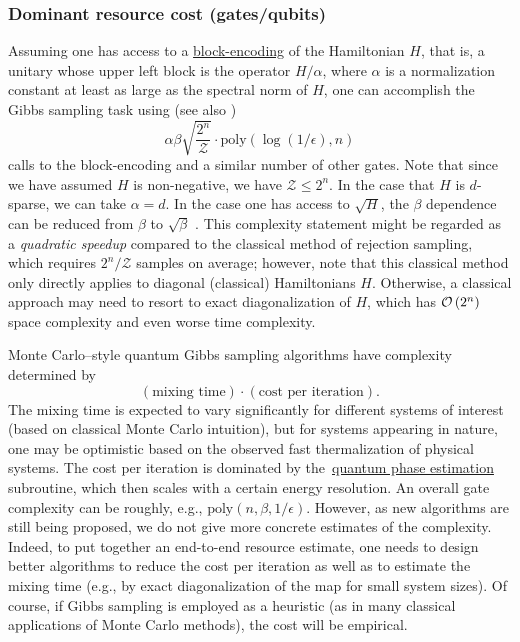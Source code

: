 \begin{refsection}

\subsubsection*{Dominant resource cost (gates/qubits)}

Assuming one has access to a \hyperref[prim:BlockEncodings]{block-encoding} of the Hamiltonian $H$, that is, a unitary whose upper left block is the operator $H/\alpha$, where $\alpha$ is a normalization constant at least as large as the spectral norm of $H$, one can accomplish the Gibbs sampling task using \cite[Lemma 44]{apeldoorn2017QSDPSolvers} (see also \cite[Corollary 16]{apeldoorn2018ImprovedQSDPSolving})
\begin{equation}\label{eq:Gibbs_complexity}
    \alpha\beta \sqrt{\frac{2^n}{\mathcal{Z}}} \cdot \text{poly}(\log(1/\epsilon), n)
\end{equation}
calls to the block-encoding and a similar number of other gates. 
Note that since we have assumed $H$ is non-negative, we have $\mathcal{Z}\leq 2^n$. In the case that $H$ is $d$-sparse, we can take $\alpha = d$. In the case one has access to $\sqrt{H}$, the $\beta$ dependence can be reduced from $\beta$ to $\sqrt{\beta}$ \cite{chowdhury2016QGibbsSampling}. This complexity statement might be regarded as a \emph{quadratic speedup} compared to the classical method of rejection sampling, which requires $2^n/\mathcal{Z}$ samples on average; however, note that this classical method only directly applies to diagonal (classical) Hamiltonians $H$. Otherwise, a classical approach may need to resort to exact diagonalization of $H$, which has $\mathcal{O}\left( 2^n \right)$ space complexity and even worse time complexity. 

Monte Carlo--style quantum Gibbs sampling algorithms have complexity determined by 
\begin{equation}
\label{eq:cost_mixing_iteration}
    (\text{mixing time}) \cdot (\text{cost per iteration}). 
\end{equation}
The mixing time is expected to vary significantly for different systems of interest (based on classical Monte Carlo intuition), but for systems appearing in nature, one may be optimistic based on the observed fast thermalization of physical systems. The cost per iteration is dominated by the~\hyperref[prim:QPE]{quantum phase estimation} subroutine, which then scales with a certain energy resolution. An overall gate complexity can be roughly, e.g., $\text{poly}(n, \beta,1/\epsilon)$. However, as new algorithms are still being proposed, we do not give more concrete estimates of the complexity.  Indeed, to put together an end-to-end resource estimate, one needs to design better algorithms to reduce the cost per iteration as well as to estimate the mixing time (e.g., by exact diagonalization of the map for small system sizes). Of course, if Gibbs sampling is employed as a heuristic (as in many classical applications of Monte Carlo methods), the cost will be empirical.


\end{refsection}
